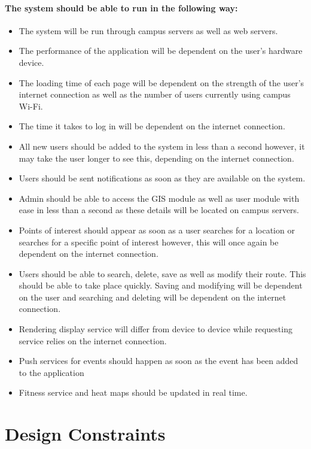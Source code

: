 \documentclass[11pt]{article}
\begin{document}
	\paragraph{The system should be able to run in the following way: }
	\begin{itemize}
	\item The system will be run through campus servers as well as web servers.
	\item The performance of the application will be dependent on the user’s hardware device.
	\item The loading time of each page will be dependent on the strength of the user’s internet connection as well as the number of users currently using campus Wi-Fi.
	\item The time it takes to log in will be dependent on the internet connection.
	\item All new users should be added to the system in less than a second however, it may take the user longer to see this, depending on the internet connection.
	\item Users should be sent notifications as soon as they are available on the system.
	\item Admin should be able to access the GIS module as well as user module with ease in less than a second as these details will be located on campus servers.
	\item Points of interest should appear as soon as a user searches for a location or searches for a specific point of interest however, this will once again be dependent on the internet connection.
	\item Users should be able to search, delete, save as well as modify their route. This should be able to take place quickly. Saving and modifying will be dependent on the user and searching and deleting will be dependent on the internet connection.
	\item Rendering display service will differ from device to device while requesting service relies on the internet connection.
	\item Push services for events should happen as soon as the event has been added to the application
	\item Fitness service and heat maps should be updated in real time.
	\end{itemize}
	
	\section{Design Constraints}
	
\end{document}
